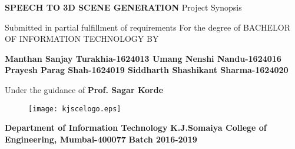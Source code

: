
\newpage
\doublespacing


\begin{center}%
\LARGE{ \textbf{SPEECH TO 3D SCENE GENERATION}}
\vspace{0.5cm}
\linebreak Project Synopsis
\end{center}

\vspace{0.5cm}

\begin{center}

Submitted in partial fulfillment of requirements
\linebreak For the degree of
\linebreak \newline
\linebreak BACHELOR OF INFORMATION TECHNOLOGY
\linebreak  BY

\end{center}
\begin{center}

\textbf{Manthan Sanjay Turakhia-1624013
\linebreak Umang Nenshi Nandu-1624016
\linebreak Prayesh Parag Shah-1624019
\linebreak Siddharth Shashikant Sharma-1624020
}

\vspace{1.5cm}
Under the guidance of
\linebreak \textbf{Prof. Sagar Korde}
\end{center} 
\vspace{1.5cm}
\begin{center}
 \begin{figure}[ht]
\centering
\texttt{[image: kjscelogo.eps]}
\end{figure}
\textbf{Department of Information Technology}
 \linebreak \textbf{K.J.Somaiya College of Engineering, Mumbai-400077}
\linebreak \textbf{Batch 2016-2019}
\end{center}

%
